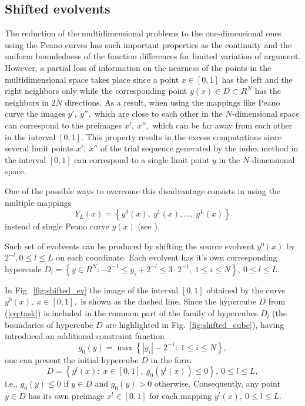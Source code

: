 \documentclass[runningheads]{llncs}
\begin{document}
\subsection{Shifted evolvents}
\label{sec:shifted}

The reduction of the multidimensional problems to the one-dimensional ones using the Peano
curves has such important properties as the continuity and the uniform boundedness of the
function differences for limited variation of argument. However, a partial loss of information on
the nearness of the points in the multidimensional space takes place since a point $x \in [0,1]$
has the left and the right neighbors only while the corresponding point $y(x) \in D \subset R^N$
has the neighbors in $2N$ directions. As a result, when using the mappings like Peano curve the
images $y',\ y'',$ which are close to each other in the $N$-dimensional space can correspond to
the preimages $x',\ x'',$ which can be far away from each other in the interval $[0,1]$. This
property results in the excess computations since several limit points $x',\ x''$ of the trial
sequence generated by the index method in the interval $[0,1]$ can correspond to a single limit
point $y$ in the $N$-dimensional space.

One of the possible ways to overcome this disadvantage consists in using the multiple mappings
\begin{equation}%
Y_L(x)=\left\{y^0(x),\ y^1(x),...,\ y^L(x)\right\}
\end{equation}
instead of single Peano curve $y(x)$ (see \cite{Strongin1991,Strongin1992,strSergGO}).

Such set of evolvents can be produced by shifting the source evolvent $y^0(x)$ by $2^{-l},0
\leq l \leq L$ on each coordinate. Each evolvent has it's own corresponding hypercude $D_l=
\left\{y \in R^N: -2^{-1} \leq y_i+2^{-l} \leq 3 \cdot 2^{-1},\ 1\leq i\leq N\right\},\ 0 \leq l \leq
L$.

In Fig.~\ref{fig:shifted_ev} the image of the interval $[0,1]$ obtained by the curve $y^0(x),\
x\in [0,1],$ is shown as the dashed line. Since the hypercube $D$ from (\ref{eq:task}) is
included in the common part of the family of hypercubes $D_l$ (the boundaries of hypercube
$D$ are highlighted in Fig.~\ref{fig:shifted_cube}), having introduced an additional constraint
function
\begin{equation}\label{6_g0}
g_0(y)=\max\left\{\left|y_i\right| - 2^{-1}:\ 1\leq i\leq N\right\},
\end{equation}
one can present the initial hypercube $D$ in the form
\[
D=\left\{y^l(x):\; x\in [0,1],\ g_0(y^l(x))\leq 0 \right\},\ 0\leq l \leq L,
\]
i.e., $g_0(y) \leq 0$ if $y\in D$ and $g_0(y)>0$ otherwise. Consequently, any point $y \in D$
has its own preimage $x^l \in [0,1]$ for each mapping $y^l(x),\ 0\leq l\leq L$.
\end{document}
